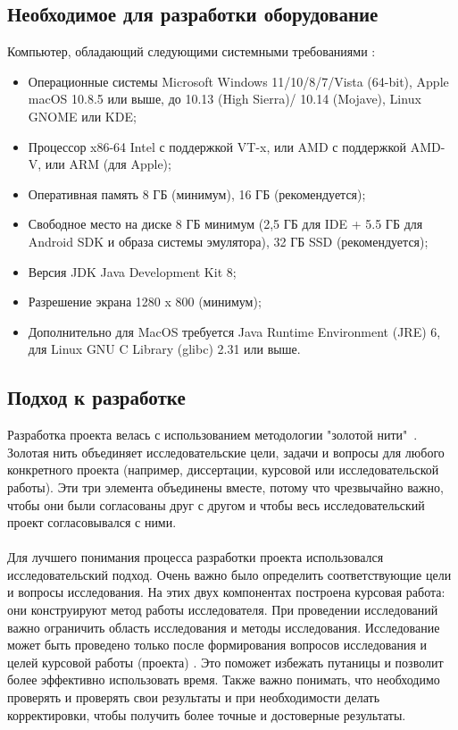 \documentclass[draft]{article}
\begin{document}
\subsection{Необходимое для разработки оборудование}
Компьютер, обладающий следующими системными требованиями \cite{litlink2}:
\begin{itemize}
\item Операционные системы Microsoft Windows 11/10/8/7/Vista (64-bit), Apple macOS 10.8.5 или выше, до 10.13 (High Sierra)/ 10.14 (Mojave), Linux GNOME или KDE;
\item Процессор x86-64 Intel с поддержкой VT-x, или AMD с поддержкой AMD-V, или ARM (для Apple);
\item Оперативная память 8 ГБ (минимум), 16 ГБ (рекомендуется);
\item Свободное место на диске	8 ГБ минимум (2,5 ГБ для IDE + 5.5 ГБ для Android SDK и образа системы эмулятора), 32 ГБ SSD (рекомендуется);
\item Версия JDK Java Development Kit 8;
\item Разрешение экрана	1280 x 800 (минимум);
\item Дополнительно для MacOS требуется Java Runtime Environment (JRE) 6, для Linux GNU C Library (glibc) 2.31 или выше.
\end{itemize}
\subsection{Подход к разработке}
Разработка проекта велась с использованием методологии "{}золотой нити"{}\ \cite{litlink3}. Золотая нить объединяет исследовательские цели, задачи и вопросы \cite{litlink4} для любого конкретного проекта (например, диссертации, курсовой или исследовательской работы). Эти три элемента объединены вместе, потому что чрезвычайно важно, чтобы они были согласованы друг с другом и чтобы весь исследовательский проект согласовывался с ними.\\
~\\
Для лучшего понимания процесса разработки проекта использовался исследовательский подход. Очень важно было определить соответствующие цели и вопросы исследования. На этих двух компонентах построена курсовая работа: они конструируют метод работы исследователя. При проведении исследований важно ограничить область исследования и методы исследования. Исследование может быть проведено только после формирования вопросов исследования и целей курсовой работы (проекта) \cite{litlink5}. Это поможет избежать путаницы и позволит более эффективно использовать время. Также важно понимать, что необходимо проверять и проверять свои результаты и при необходимости делать корректировки, чтобы получить более точные и достоверные результаты.
\newpage
\end{document}
